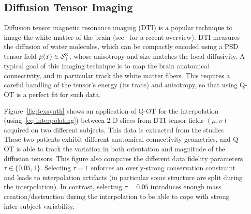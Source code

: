 



\subsection{Diffusion Tensor Imaging}

Diffusion tensor magnetic resonance imaging (DTI) is a popular technique to image the white matter of the brain (see~\cite{wandell2016clarifying} for a recent overview). DTI measures the diffusion of water molecules, which can be compactly encoded using a PSD tensor field $\mu(x) \in \mathcal{S}_+^3$, whose anisotropy and size matches the local diffusivity. 
%
A typical goal of this imaging technique is to map the brain anatomical connectivity, and in particular track the  white matter fibers. This requires a careful handling of the tensor's energy (its trace) and anisotropy, so that using Q-OT is a perfect fit for such data.

Figure~\ref{fig:texsynth} shows an application of Q-OT for the interpolation (using~\ref{eq-interpolating}) between 2-D slices from DTI tensor fields $(\mu,\nu)$ acquired on two different subjects. This data is extracted from the studies~\cite{pestilli2014evaluation,takemura2016ensemble}. These two patients exhibit different anatomical connectivity geometries, and Q-OT is able to track the variation in both orientation and magnitude of the diffusion tensors. This figure also compares the different data fidelity parameters $\tau \in \{0.05,1\}$. Selecting $\tau=1$ enforces an overly-strong conservation constraint and leads to interpolation artifacts (in particular some structure are split during the interpolation). In contrast, selecting $\tau=0.05$ introduces enough mass creation/destruction during the interpolation to be able to cope with strong inter-subject variability.

